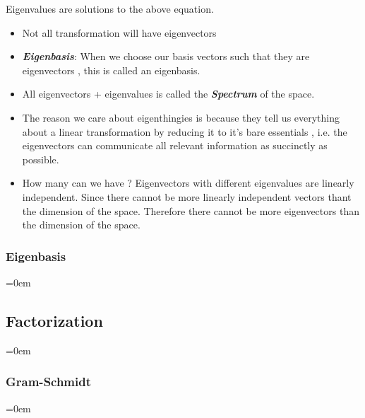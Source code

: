 Eigenvalues are solutions to the above equation.



\begin{itemize}[noitemsep]
	\item Not all transformation will have eigenvectors
	\item \textbf{\textit{Eigenbasis}}: When we choose our basis vectors such that they are eigenvectors , this is called an eigenbasis.
	\item All eigenvectors + eigenvalues is called the \textbf{\textit{Spectrum}} of the space.
	\item The reason we care about eigenthingies is because they tell us everything about a linear transformation by reducing it to it's bare essentials , i.e. the eigenvectors can communicate all relevant information as succinctly as possible.
	\item How many can we have ? Eigenvectors with different eigenvalues are linearly independent. Since there cannot be more linearly independent vectors thant the dimension of the space. Therefore there cannot be more eigenvectors than the dimension of the space.
\end{itemize}

\subsubsection{Eigenbasis}
\label{sssec:eigenbasis}
\parindent=0em



\subsubsectionend





\subsectionend

\subsection{Factorization}
\label{ssec:factorization}
\parindent=0em

\subsubsection{Gram-Schmidt}
\label{sssec:gram_schmidt}
\parindent=0em



\subsubsectionend
